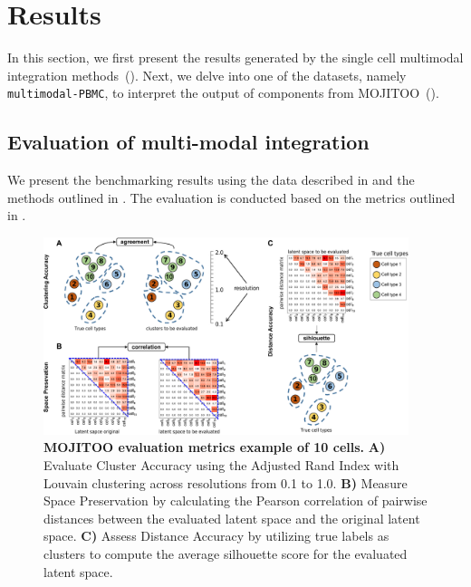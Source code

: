 \section{Results}
\label{MOJITOO:out}

In this section, we first present the results generated by the single cell multimodal integration methods~(). Next, we delve into one of the datasets, namely \texttt{multimodal-PBMC}, to interpret the output of components from MOJITOO~().

\subsection{Evaluation of multi-modal integration}
\label{MOJITOO:out:bench}

We present the benchmarking results using the data described in  and the methods outlined in . The evaluation is conducted based on the metrics outlined in .

\begin{figure}[!ht]
	\centering
	\includegraphics[width=0.95\textwidth]{MOJITOO_bench_metrics/fig}
	\vspace{0.1cm}
	\caption[MOJITOO evaluation metrics example]{
	\textbf{MOJITOO evaluation metrics example of 10 cells.}  \textbf{A)} Evaluate Cluster Accuracy using the Adjusted Rand Index with Louvain clustering across resolutions from 0.1 to 1.0. \textbf{B)} Measure Space Preservation by calculating the Pearson correlation of pairwise distances between the evaluated latent space and the original latent space. \textbf{C)} Assess Distance Accuracy by utilizing true labels as clusters to compute the average silhouette score for the evaluated latent space.}
	\label{fig:bench_metrics}
\end{figure}


